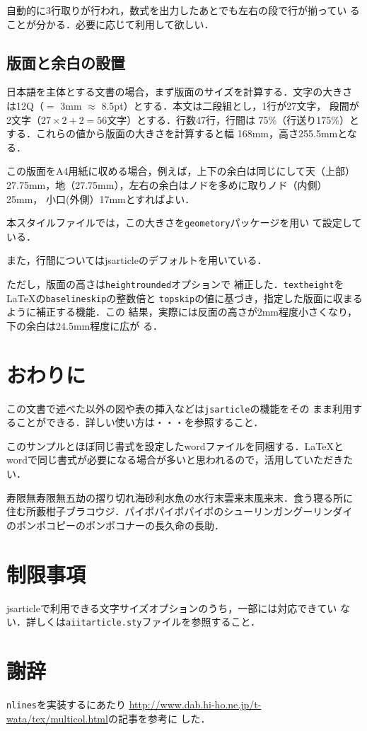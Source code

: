 \documentclass[a4j, 12Q, twocolumn, twoside]{jsarticle}
\newcommand{\cmd}[1]{\texttt{\symbol{"5C}#1}} %
\begin{document}
自動的に3行取りが行われ，数式を出力したあとでも左右の段で行が揃ってい
ることが分かる．必要に応じて利用して欲しい．

\subsection{版面と余白の設置}
日本語を主体とする文書の場合，まず版面のサイズを計算する．文字の大きさ
は12Q（$=$ 3mm $\approx$ 8.5pt）とする．本文は二段組とし，1行が27文字，
段間が2文字（$27 \times 2 + 2 = 56$文字）とする．行数47行，行間は
75\%（行送り175\%）とする．これらの値から版面の大きさを計算すると幅
168mm，高さ255.5mmとなる．

この版面をA4用紙に収める場合，例えば，上下の余白は同じにして天（上部）
27.75mm，地（27.75mm），左右の余白はノドを多めに取りノド（内側）25mm，
小口(外側）17mmとすればよい．

本スタイルファイルでは，この大きさを\texttt{geometory}パッケージを用い
て設定している．

また，行間についてはjsarticleのデフォルトを用いている．

ただし，版面の高さは\texttt{heightrounded}オプションで
補正した．\cmd{textheight}を\LaTeX の\cmd{baselineskip}の整数倍と
\cmd{topskip}の値に基づき，指定した版面に収まるように補正する機能．この
結果，実際には反面の高さが2mm程度小さくなり，下の余白は24.5mm程度に広が
る．

\section{おわりに}
この文書で述べた以外の図や表の挿入などは\texttt{jsarticle}の機能をその
まま利用することができる．詳しい使い方は・・・を参照すること．

このサンプルとほぼ同じ書式を設定したwordファイルを同梱する．\LaTeX と
wordで同じ書式が必要になる場合が多いと思われるので，活用していただきた
い．

寿限無寿限無五劫の摺り切れ海砂利水魚の水行末雲来末風来末．食う寝る所に
住む所藪柑子ブラコウジ．パイポパイポパイポのシューリンガングーリンダイ
のポンポコピーのポンポコナーの長久命の長助．

\section{制限事項}
jsarticleで利用できる文字サイズオプションのうち，一部には対応できてい
ない．詳しくは\texttt{aiitarticle.sty}ファイルを参照すること．

\section{謝辞}
\cmd{nlines}を実装するにあたり
\url{http://www.dab.hi-ho.ne.jp/t-wata/tex/multicol.html}の記事を参考に
した．
\end{document}

